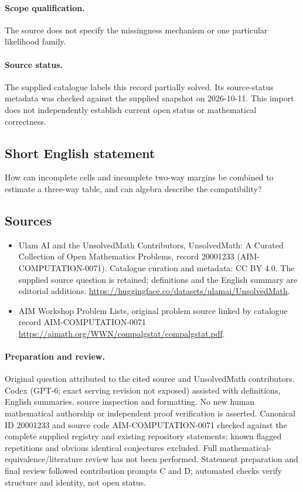 \documentclass[11pt]{article}
\begin{document}
\paragraph{Scope qualification.}
The source does not specify the missingness mechanism or one particular likelihood family.
\paragraph{Source status.}
The supplied catalogue labels this record partially solved. Its source-status metadata was checked against the supplied snapshot on 2026-10-11. This import does not independently establish current open status or mathematical correctness.
\subsection{Short English statement}
How can incomplete cells and incomplete two-way margins be combined to estimate a three-way table, and can algebra describe the compatibility?
\subsection{Sources}
\begin{itemize}
\item[S1] Ulam AI and the UnsolvedMath Contributors, UnsolvedMath: A Curated Collection of Open Mathematics Problems, record 20001233 (AIM-COMPUTATION-0071). Catalogue curation and metadata: CC BY 4.0. The supplied source question is retained; definitions and the English summary are editorial additions.
\url{https://huggingface.co/datasets/ulamai/UnsolvedMath}.
\item[S2] AIM Workshop Problem Lists, original problem source linked by catalogue record AIM-COMPUTATION-0071
\url{https://aimath.org/WWN/compalgstat/compalgstat.pdf}.
\end{itemize}
\paragraph{Preparation and review.}
Original question attributed to the cited source and UnsolvedMath contributors. Codex (GPT-6; exact serving revision not exposed) assisted with definitions, English summaries, source inspection and formatting. No new human mathematical authorship or independent proof verification is asserted. Canonical ID 20001233 and source code AIM-COMPUTATION-0071 checked against the complete supplied registry and existing repository statements; known flagged repetitions and obvious identical conjectures excluded. Full mathematical-equivalence/literature review has not been performed. Statement preparation and final review followed contribution prompts C and D; automated checks verify structure and identity, not open status.
\label{end:20001233}
\end{document}
